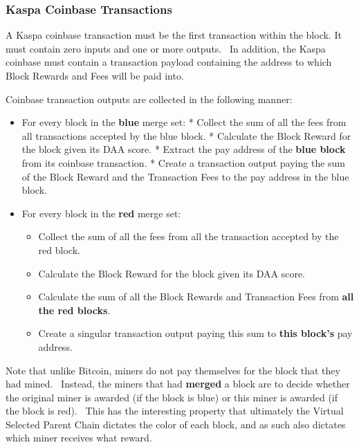 \subsubsection{Kaspa Coinbase Transactions}

A Kaspa coinbase transaction must be the first transaction within the block. It must contain zero inputs and one or more outputs. \
In addition, the Kaspa coinbase must contain a transaction payload containing the address to which Block Rewards and Fees will be paid into.

Coinbase transaction outputs are collected in the following manner:
\begin{itemize}
\item For every block in the \textbf{blue} merge set:
  * Collect the sum of all the fees from all transactions accepted by the blue block.
  * Calculate the Block Reward for the block given its DAA score.
  * Extract the pay address of the \textbf{blue block} from its coinbase transaction.
  * Create a transaction output paying the sum of the Block Reward and the Transaction Fees to the pay address in the blue block.
\item For every block in the \textbf{red} merge set:
    \begin{itemize}
    \item Collect the sum of all the fees from all the transaction accepted by the red block.
    \item Calculate the Block Reward for the block given its DAA score.
    \item Calculate the sum of all the Block Rewards and Transaction Fees from \textbf{all the red blocks}.
    \item Create a singular transaction output paying this sum to \textbf{this block's} pay address.
    \end{itemize}
\end{itemize}

Note that unlike Bitcoin, miners do not pay themselves for the block that they had mined. \
Instead, the miners that had \textbf{merged} a block are to decide whether the original miner is awarded (if the block is blue) or this miner is awarded (if the block is red). \
This has the interesting property that ultimately the Virtual Selected Parent Chain dictates the color of each block, and as such  also dictates which miner receives what reward.
